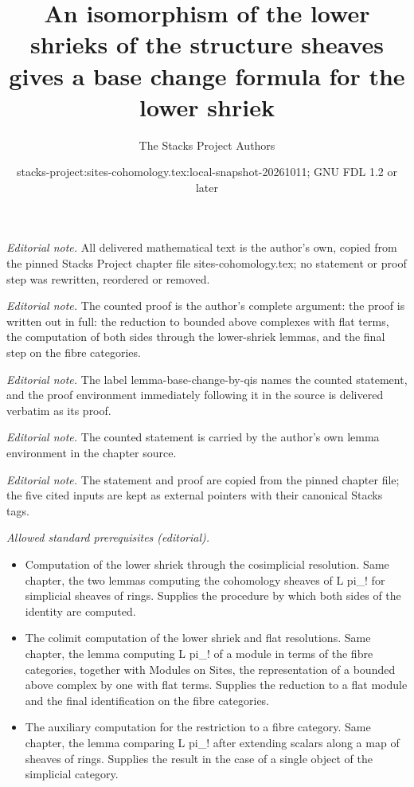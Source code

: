 \documentclass[10pt,a4paper]{amsart}
\title{An isomorphism of the lower shrieks of the structure sheaves gives a base change formula for the lower shriek}
\author{The Stacks Project Authors}
\date{stacks-project:sites-cohomology.tex:local-snapshot-20261011; GNU FDL 1.2 or later}
\theoremstyle{plain}
\theoremstyle{definition}
\theoremstyle{remark}
\numberwithin{equation}{subsection}
\begin{document}
\maketitle
\noindent\textit{Editorial note.} All delivered mathematical text is the author's own, copied from the pinned Stacks Project chapter file sites-cohomology.tex; no statement or proof step was rewritten, reordered or removed.\par\medskip
\noindent\textit{Editorial note.} The counted proof is the author's complete argument: the proof is written out in full: the reduction to bounded above complexes with flat terms, the computation of both sides through the lower-shriek lemmas, and the final step on the fibre categories.\par\medskip
\noindent\textit{Editorial note.} The label lemma-base-change-by-qis names the counted statement, and the proof environment immediately following it in the source is delivered verbatim as its proof.\par\medskip
\noindent\textit{Editorial note.} The counted statement is carried by the author's own lemma environment in the chapter source.\par\medskip
\noindent\textit{Editorial note.} The statement and proof are copied from the pinned chapter file; the five cited inputs are kept as external pointers with their canonical Stacks tags.\par\medskip
\noindent\textit{Allowed standard prerequisites (editorial).}\begin{itemize}
\item Computation of the lower shriek through the cosimplicial resolution. Same chapter, the two lemmas computing the cohomology sheaves of L pi\_! for simplicial sheaves of rings. Supplies the procedure by which both sides of the identity are computed.
\item The colimit computation of the lower shriek and flat resolutions. Same chapter, the lemma computing L pi\_! of a module in terms of the fibre categories, together with Modules on Sites, the representation of a bounded above complex by one with flat terms. Supplies the reduction to a flat module and the final identification on the fibre categories.
\item The auxiliary computation for the restriction to a fibre category. Same chapter, the lemma comparing L pi\_! after extending scalars along a map of sheaves of rings. Supplies the result in the case of a single object of the simplicial category.
\end{itemize}\medskip
\end{document}
